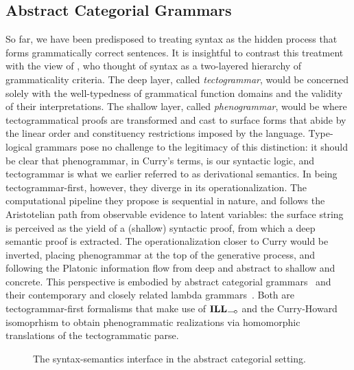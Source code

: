 \subsection{Abstract Categorial Grammars}
\label{subsection:ACG}
So far, we have been predisposed to treating syntax as the hidden process that forms grammatically correct sentences.
It is insightful to contrast this treatment with the view of \citet{curry1961some}, who thought of syntax as a two-layered hierarchy of grammaticality criteria.
The deep layer, called \textit{tectogrammar}, would be concerned solely with the well-typedness of grammatical function domains and the validity of their interpretations.
The shallow layer, called \textit{phenogrammar}, would be where tectogrammatical proofs are transformed and cast to surface forms that abide by the linear order and constituency restrictions imposed by the language.
Type-logical grammars pose no challenge to the legitimacy of this distinction: it should be clear that phenogrammar, in Curry's terms, is our syntactic logic, and tectogrammar is what we earlier referred to as derivational semantics.
In being tectogrammar-first, however, they diverge in its operationalization.
The computational pipeline they propose is sequential in nature, and follows the Aristotelian path from observable evidence to latent variables: the surface string is perceived as the yield of a (shallow) syntactic proof, from which a deep semantic proof is extracted.
The operationalization closer to Curry would be inverted, placing phenogrammar at the top of the generative process, and following the Platonic information flow from deep and abstract to shallow and concrete.
This perspective is embodied by abstract categorial grammars~\cite{de2001towards} and their contemporary and closely related lambda grammars~\cite{muskens2001lambda}.
Both are tectogrammar-first formalisms that make use of $\ILL_{\li}$ and the Curry-Howard isomoprhism to obtain phenogrammatic realizations via homomorphic translations of the tectogrammatic parse.

\begin{figure}
	\centering
	\caption{The syntax-semantics interface in the abstract categorial setting.}
	\label{figure:synsemacg}
\end{figure}

